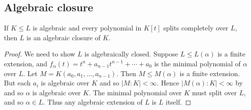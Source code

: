 \documentclass{article}
\begin{document}
\subsection{Algebraic closure}



\begin{nlemma}\label{lem:5.3}
    If $K \leq L$ is algebraic and every polynomial in $K[t]$ splits completely over $L$, then $L$ is an algebraic closure of $K$.
\end{nlemma}
\begin{proof}
    We need to show $L$ is algebraically closed.
    Suppose $L \leq L(\alpha)$ is a finite extension, and $f_\alpha(t) = t^n + a_{n-1} t^{n-1} + \dotsb + a_0$ is the minimal polynomial of $\alpha$ over $L$.
    Let $M = K(a_0, a_1, \dotsc, a_{n-1})$.
    Then $M \leq M(\alpha)$ is a finite extension.
    But each $a_i$ is algebraic over $K$ and so $|M:K|<\infty$.
    Hence $|M(\alpha):K| < \infty$ by  and so $\alpha$ is algebraic over $K$.
    The minimal polynomial over $K$ must split over $L$, and so $\alpha \in L$.
    Thus any algebraic extension of $L$ is $L$ itself.
\end{proof}
\end{document}
